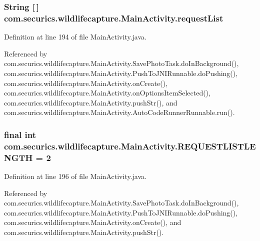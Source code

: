 \subsubsection[{request\+List}]{\setlength{\rightskip}{0pt plus 5cm}String [$\,$] com.\+securics.\+wildlifecapture.\+Main\+Activity.\+request\+List\hspace{0.3cm}{\ttfamily [private]}}\label{classcom_1_1securics_1_1wildlifecapture_1_1_main_activity_af66c321e0bd25d9fb672e785e936531c}


Definition at line 194 of file Main\+Activity.\+java.



Referenced by com.\+securics.\+wildlifecapture.\+Main\+Activity.\+Save\+Photo\+Task.\+do\+In\+Background(), com.\+securics.\+wildlifecapture.\+Main\+Activity.\+Push\+To\+J\+N\+I\+Runnable.\+do\+Pushing(), com.\+securics.\+wildlifecapture.\+Main\+Activity.\+on\+Create(), com.\+securics.\+wildlifecapture.\+Main\+Activity.\+on\+Options\+Item\+Selected(), com.\+securics.\+wildlifecapture.\+Main\+Activity.\+push\+Str(), and com.\+securics.\+wildlifecapture.\+Main\+Activity.\+Auto\+Code\+Runner\+Runnable.\+run().

\subsubsection[{R\+E\+Q\+U\+E\+S\+T\+L\+I\+S\+T\+L\+E\+N\+G\+T\+H}]{\setlength{\rightskip}{0pt plus 5cm}final int com.\+securics.\+wildlifecapture.\+Main\+Activity.\+R\+E\+Q\+U\+E\+S\+T\+L\+I\+S\+T\+L\+E\+N\+G\+T\+H = 2\hspace{0.3cm}{\ttfamily [private]}}\label{classcom_1_1securics_1_1wildlifecapture_1_1_main_activity_ad4062bb96e8a0cbe20bec174e939eac3}


Definition at line 196 of file Main\+Activity.\+java.



Referenced by com.\+securics.\+wildlifecapture.\+Main\+Activity.\+Save\+Photo\+Task.\+do\+In\+Background(), com.\+securics.\+wildlifecapture.\+Main\+Activity.\+Push\+To\+J\+N\+I\+Runnable.\+do\+Pushing(), com.\+securics.\+wildlifecapture.\+Main\+Activity.\+on\+Create(), and com.\+securics.\+wildlifecapture.\+Main\+Activity.\+push\+Str().

